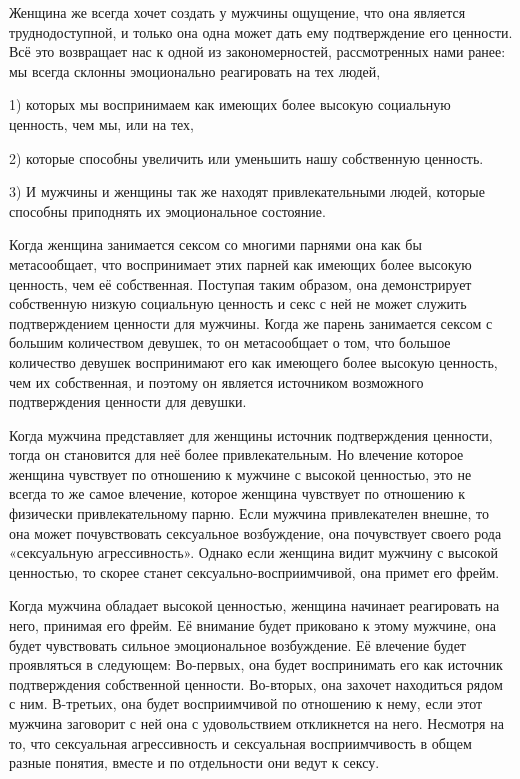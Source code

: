 Женщина же всегда хочет создать у мужчины ощущение, что она является труднодоступной, и только она одна может дать ему подтверждение его ценности. Всё это возвращает нас к одной из закономерностей, рассмотренных нами ранее: мы всегда склонны эмоционально реагировать на тех людей,

1) которых мы воспринимаем как имеющих более высокую социальную ценность, чем мы, или на тех,

2) которые способны увеличить или уменьшить нашу собственную ценность.

3) И мужчины и женщины так же находят привлекательными людей, которые способны приподнять их эмоциональное состояние.

Когда женщина занимается сексом со многими парнями она как бы метасообщает, что воспринимает этих парней как имеющих более высокую ценность, чем её собственная. Поступая таким образом, она демонстрирует собственную низкую социальную ценность и секс с ней не может служить подтверждением ценности для мужчины. Когда же парень занимается сексом с большим количеством девушек, то он метасообщает о том, что большое количество девушек воспринимают его как имеющего более высокую ценность, чем их собственная, и поэтому он является источником возможного подтверждения ценности для девушки.

Когда мужчина представляет для женщины источник подтверждения ценности, тогда он становится для неё более привлекательным. Но влечение которое женщина чувствует по отношению к мужчине с высокой ценностью, это не всегда то же самое влечение, которое женщина чувствует по отношению к физически привлекательному парню. Если мужчина привлекателен внешне, то она может почувствовать сексуальное возбуждение, она почувствует своего рода «сексуальную агрессивность». Однако если женщина видит мужчину с высокой ценностью, то скорее станет сексуально-восприимчивой, она примет его фрейм.

Когда мужчина обладает высокой ценностью, женщина начинает реагировать на него, принимая его фрейм. Её внимание будет приковано к этому мужчине, она будет чувствовать сильное эмоциональное возбуждение. Её влечение будет проявляться в следующем: Во-первых, она будет воспринимать его как источник подтверждения собственной ценности. Во-вторых, она захочет находиться рядом с ним. В-третьих, она будет восприимчивой по отношению к нему, если этот мужчина заговорит с ней она с удовольствием откликнется на него. Несмотря на то, что сексуальная агрессивность и сексуальная восприимчивость в общем разные понятия, вместе и по отдельности они ведут к сексу.

